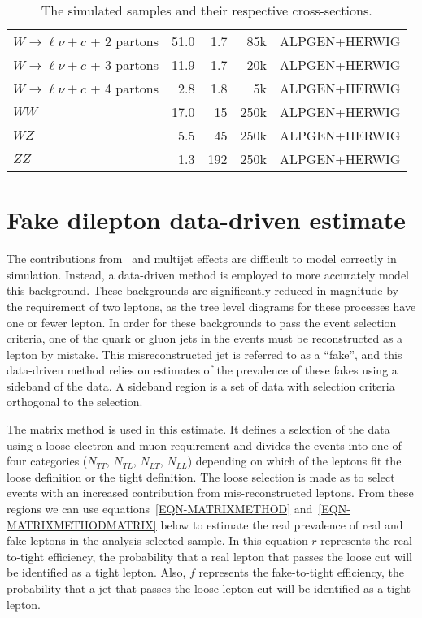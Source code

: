 \begin{table}[phtdp]
\begin{center}
\begin{tabular}{lrrrr}
$W\to \ell\nu+c$ + 2 partons  & 51.0  &  1.7 &     85k& ALPGEN+HERWIG \\[1mm]     
$W\to \ell\nu+c$ + 3 partons  & 11.9  &  1.7    &  20k & ALPGEN+HERWIG \\[1mm] 
$W\to \ell\nu+c$ + 4 partons  & 2.8   & 1.8   &    5k & ALPGEN+HERWIG \\[1mm] 
\hline
$WW$                         & 17.0    &  15         &  250k & ALPGEN+HERWIG        \\[1mm]
$WZ$                         & 5.5     &  45         &  250k & ALPGEN+HERWIG        \\[1mm]
$ZZ$                         & 1.3     &  192        &  250k & ALPGEN+HERWIG        \\[1mm]
\hline\hline
\end{tabular}
\caption{The simulated samples and their respective cross-sections.}
\label{TABLE-BACKGROUND-MCSAMPLES2}
\end{center}
\end{table}


\section{Fake dilepton data-driven estimate}
\label{SECTION-QCD-ESTIMATE}

The contributions from \Wjets\ and multijet effects are difficult to model correctly in simulation. Instead, a data-driven method is employed to more accurately model this background. These backgrounds are significantly reduced in magnitude by the requirement of two leptons, as the tree level diagrams for these processes have one or fewer lepton. In order for these backgrounds to pass the event selection criteria, one of the quark or gluon jets in the events must be reconstructed as a lepton by mistake. This misreconstructed jet is referred to as a ``fake'', and this data-driven method relies on estimates of the prevalence of these fakes using a sideband of the data. A sideband region is a set of data with selection criteria orthogonal to the selection. 

The matrix method is used in this estimate. It defines a selection of the data using a loose electron and muon requirement and divides the events into one of four categories ($N_{TT}$, $N_{TL}$, $N_{LT}$, $N_{LL}$) depending on which of the leptons fit the loose definition or the tight definition. The loose selection is made as to select events with an increased contribution from mis-reconstructed leptons. From these regions we can use equations~\ref{EQN-MATRIXMETHOD} and~\ref{EQN-MATRIXMETHODMATRIX} below to estimate the real prevalence of real and fake leptons in the analysis selected sample. In this equation $r$ represents the real-to-tight efficiency, the probability that a real lepton that passes the loose cut will be identified as a tight lepton. Also, $f$ represents the fake-to-tight efficiency, the probability that a jet that passes the loose lepton cut will be identified as a tight lepton. 

